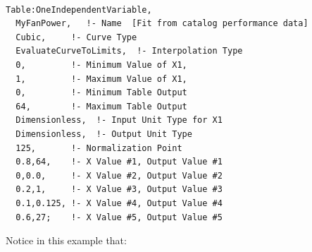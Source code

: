 \begin{lstlisting}

Table:OneIndependentVariable,
  MyFanPower,   !- Name  [Fit from catalog performance data]
  Cubic,     !- Curve Type
  EvaluateCurveToLimits,  !- Interpolation Type
  0,         !- Minimum Value of X1,
  1,         !- Maximum Value of X1,
  0,         !- Minimum Table Output
  64,        !- Maximum Table Output
  Dimensionless,  !- Input Unit Type for X1
  Dimensionless,  !- Output Unit Type
  125,       !- Normalization Point
  0.8,64,    !- X Value #1, Output Value #1
  0,0.0,     !- X Value #2, Output Value #2
  0.2,1,     !- X Value #3, Output Value #3
  0.1,0.125, !- X Value #4, Output Value #4
  0.6,27;    !- X Value #5, Output Value #5
\end{lstlisting}

Notice in this example that:

